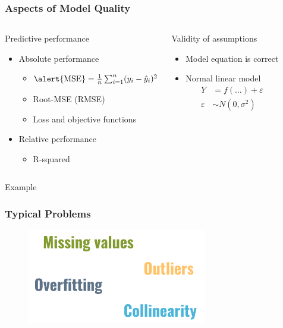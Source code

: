 \documentclass[
    utf8,
    aspectratio=169
]{beamer}  %
\begin{document}
\begin{frame}
	\frametitle{Aspects of Model Quality}
	\begin{columns}[onlytextwidth]
		\begin{block}{Predictive performance}
			\begin{itemize}
				\item Absolute performance
					\begin{itemize}
						\item $\text{\alert{MSE}} = \frac{1}{n}\sum_{i = 1}^n (y_i - \hat y_i)^2$
						\item Root-MSE (\alert{RMSE})
						\item Loss and objective functions	
					\end{itemize}
				\item Relative performance
					\begin{itemize}
						\item \alert{R-squared}
					\end{itemize}
			\end{itemize}
		\end{block}	
	
		\begin{block}{Validity of assumptions}
			\begin{itemize}
				\item Model equation is correct
				\item \alert{Normal} linear model
				 \begin{align*}
					 Y &= f(\dots) + \varepsilon \\
					 \varepsilon &\sim N(0, \sigma^2)
				 \end{align*}
			\end{itemize}
		\end{block}
	\end{columns}

	\vfill
	
	\begin{exampleblock}{\centering Example}
	\end{exampleblock}
\end{frame}

\begin{frame}
	\frametitle{Typical Problems}
	\begin{figure}
		\includegraphics[width=0.7\textwidth]{pics/linear_problems.png}
	\end{figure}
\end{frame}
\end{document}
